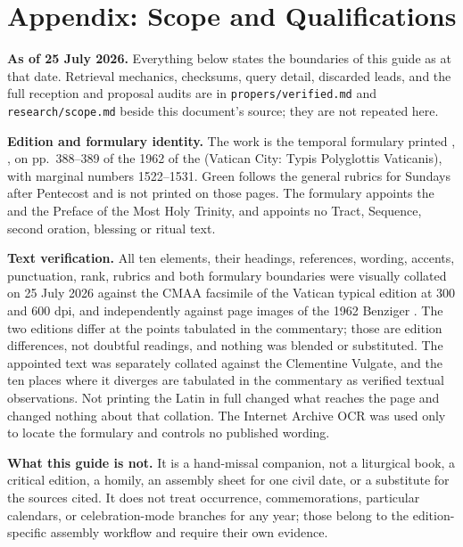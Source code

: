 \sectionguard
\section*{Appendix: Scope and Qualifications}

\textbf{As of 25 July 2026.} Everything below states the boundaries of this
guide as at that date. Retrieval mechanics, checksums, query detail, discarded
leads, and the full reception and proposal audits are in
\texttt{propers/verified.md} and \texttt{research/scope.md} beside this
document's source; they are not repeated here.

\editionnote

\textbf{Edition and formulary identity.} The work is the temporal formulary
printed , , on pp.\
388--389 of the 1962  of the 
(Vatican City: Typis Polyglottis Vaticanis), with marginal numbers 1522--1531.
Green follows the general rubrics for Sundays after Pentecost and is not
printed on those pages. The formulary appoints the \latin{Credo} and the
Preface of the Most Holy Trinity, and appoints no Tract, Sequence, second
oration, blessing or ritual text.

\textbf{Text verification.} All ten elements, their headings, references,
wording, accents, punctuation, rank, rubrics and both formulary boundaries
were visually collated on 25 July 2026 against the CMAA facsimile of the
Vatican typical edition at 300 and 600 dpi, and independently against page
images of the 1962 Benziger \latin{editio iuxta typicam}. The two editions
differ at the points tabulated in the commentary; those are edition
differences, not doubtful readings, and nothing was blended or substituted.
The appointed text was separately collated against the Clementine Vulgate, and
the ten places where it diverges are tabulated in the commentary as verified
textual observations. Not printing the Latin in full changed what reaches the
page and changed nothing about that collation. The Internet Archive OCR was
used only to locate the formulary and controls no published wording.

\textbf{What this guide is not.} It is a hand-missal companion, not a
liturgical book, a critical edition, a homily, an assembly sheet for one civil
date, or a substitute for the sources cited. It does not treat occurrence,
commemorations, particular calendars, or celebration-mode branches for any
year; those belong to the edition-specific assembly workflow and require their
own evidence.

